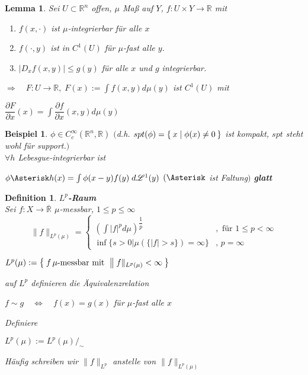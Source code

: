 \documentclass[11pt]{memoir}
\theoremstyle{changebreak}
\newtheorem{Definition}{Definition}[chapter]
\newtheorem{Beispiel}{Beispiel}[chapter]
\newtheorem{Lemma}{Lemma}[chapter]
\begin{document}
\begin{Lemma}
Sei $U \subset \mathbb R^n$ offen, $\mu$ Maß auf $Y$, $f: U \times Y \rightarrow \mathbb R$ mit
\begin{enumerate}
	\item $f(x, \cdotp)$ ist $\mu$-integrierbar für alle $x$
	\item $f(\cdotp, y)$ ist in $C^1(U)$ für $\mu$-fast alle $y$.
	\item $|D_x f(x, y)| \leq g(y)$ für alle $x$ und $g$ integrierbar. \\
\end{enumerate}
$\Rightarrow \quad F: U \rightarrow \mathbb R, \;F(x):= \int f(x, y) d\mu(y)$ ist $C^1(U)$ mit 
\begin{center}
	$\dfrac{\partial F}{\partial x}(x) = \int \dfrac{\partial f}{\partial x}(x, y) d\mu(y)$
\end{center}
\end{Lemma}

\begin{Beispiel}
$\phi \in C_c^\infty(\mathbb R^n, \mathbb R)$ $($d.h. $spt(\phi) = \Set{x| \phi(x) \ne 0}$ ist kompakt, $spt$ steht wohl für support.$)$  \\
$\forall h$ Lebesgue-integrierbar ist \\
\begin{center}
	$\phi \Asterisk h(x) = \int \phi(x-y)f(y)\; d\mathscr L^1(y)$ $(\Asterisk$ ist \emph{Faltung}$)$ \quad\textbf{glatt}
\end{center}
\end{Beispiel}


\begin{Definition}
\emph{\textbf{$L^p$-Raum}} \\
Sei $f: X \rightarrow \overline{\mathbb R}$ $\mu$-messbar, $1 \leq p \leq \infty$ \\
\begin{equation}
\|f\|_{L^p (\mu)} =
\begin{cases}
	\left( \int |f|^p d\mu\right) ^{\dfrac{1}{p}} & , \text{ für } 1 \leq p < \infty \\
	\inf \{s > 0 | \mu(\{|f| > s\}) = \infty \} & ,\, p = \infty
\end{cases}
\end{equation}
\begin{center}
	$L^p(\mu):= \Set{f \, \mu\text{-messbar mit }\|f\|_{L^p (\mu)} < \infty}$
\end{center}
auf $L^p$ definieren die Äquivalenzrelation
\begin{center}
	$f \sim g \quad \Leftrightarrow \quad f(x) = g(x)$ für $\mu$-fast alle $x$
\end{center}
Definiere 
\begin{center}
	$L^p(\mu) := L^p(\mu) /_\sim$ 
\end{center}
Häufig schreiben wir $\|f\|_{L^p}$ anstelle von $\|f\|_{L^p (\mu)}$
\end{Definition}
\end{document}
